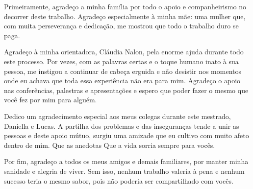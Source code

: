 Primeiramente, agradeço a minha família por todo o apoio e companheirismo no decorrer deste trabalho. Agradeço especialmente à minha mãe: uma mulher que, com muita perseverança e dedicação, me mostrou que todo o trabalho duro se paga.

Agradeço à minha orientadora, Cláudia Nalon, pela enorme ajuda durante todo este processo. Por vezes, com as palavras certas e o toque humano inato à sua pessoa, me instigou a continuar de cabeça erguida e não desistir nos momentos onde eu achava que toda essa experiência não era para mim. Agradeço o apoio nas conferências, palestras e apresentações e espero que poder fazer o mesmo que você fez por mim para alguém.

Dedico um agradecimento especial aos meus colegas durante este mestrado, Daniella e Lucas. A partilha dos problemas e das inseguranças tende a unir as pessoas e deste apoio mútuo, surgiu uma amizade que eu cultivo com muito afeto dentro de mim. Que as anedotas Que a vida sorria sempre para vocês.

Por fim, agradeço a todos os meus amigos e demais familiares, por manter minha sanidade e alegria de viver. Sem isso, nenhum trabalho valeria à pena e nenhum sucesso teria o mesmo sabor, pois não poderia ser compartilhado com vocês.